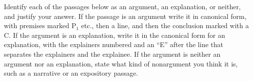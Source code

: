 \begin{exercises}
{
}{\vspace{1.5in}}

\end{exercises}


\noindent\problempart Identify each of the passages below as an argument, an explanation, or neither, and justify your answer. If the passage is an argument write it in canonical form, with premises marked P$_1$ etc., then a line, and then the conclusion marked with a C. If the argument is an explanation, write it in the canonical form for an explanation, with the explainers numbered and an ``E'' after the line that separates the explainers and the explainee. If the argument is neither an argument nor an explanation, state what kind of nonargument you think it is, such as a narrative or an expository passage.

